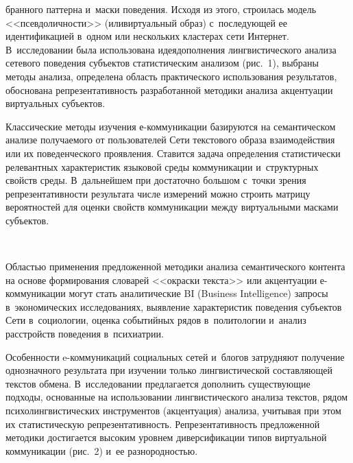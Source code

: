 \begin{multicols}{2}
\vspace*{9pt}

\addtocounter{figure}{1}



\noindent
бранного паттерна и~маски поведения. Исходя из\linebreak
 этого, 
строилась модель <<псевдоличности>> (или\linebreak виртуальный образ) 
с~последующей ее идентификацией в~одном или нескольких кластерах сети 
Ин\-тер\-нет. В~исследовании была использована идея\linebreak дополне\-ния 
лингвистического анализа сетевого поведения субъектов статистическим 
анализом (рис.~1), выбраны методы анализа, определена область 
практического использования результатов, обоснована репрезентативность 
разработанной методики анализа акцентуации виртуальных субъектов.
  
  Классические методы изучения е-ком\-му\-ни\-ка\-ции базируются на 
семантическом анализе получаемого от пользователей Сети текстового образа 
взаимодействия или их поведенческого проявления. Ставится задача 
определения статистически релевантных характеристик языковой среды 
коммуникации и~структурных свойств среды. В~дальнейшем при достаточно 
большом с~точки зрения репрезентативности результата числе измерений 
можно строить матрицу вероятностей для оценки свойств коммуникации между 
виртуальными масками субъектов. 
  
  \begin{figure*} %
  \vspace*{1pt}
\begin{center}
\mbox{%
\epsfxsize=120.335mm
}
\end{center}
\vspace*{-11pt}
\end{figure*}
  

  Областью применения предложенной методики анализа семантического 
контента на основе формирования словарей <<окраски текста>> или 
акцентуации е-ком\-му\-ни\-ка\-ции могут стать аналитические BI (Business Intelligence)
за\-про\-сы 
в~экономических исследованиях, выявление характеристик поведения 
субъектов Сети в~социологии, оценка событийных рядов в~политологии 
и~анализ расстройств поведения в~пси\-хи\-атрии.
  
  Особенности e-ком\-му\-ни\-ка\-ций социальных сетей и~блогов затрудняют 
получение однозначного результата при изучении только лингвистической 
составляющей текстов обмена. В~исследовании предлагается дополнить 
существующие подходы, основанные на использовании лингвистического 
анализа текстов, рядом психолингвистических инструментов (акцентуация) 
анализа, учитывая при
 этом их статистическую репрезентативность. 
Репрезентативность предложенной методики достигается высоким уровнем 
диверсификации типов виртуальной коммуникации (рис.~2) и~ее 
разнородностью.
  


\end{multicols}
